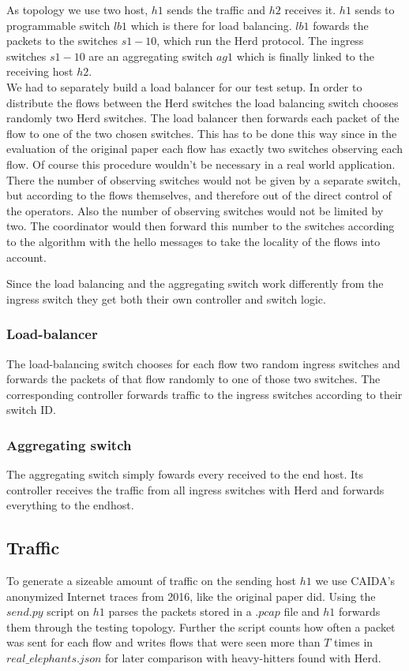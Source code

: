 \documentclass[11pt,oneside,a4paper]{article}
\begin{document}
As topology we use two host, $h1$ sends the traffic and $h2$ receives it. $h1$ sends to programmable switch $lb1$ which is there for load balancing. $lb1$ fowards the packets to the switches $s1 - 10$, which run the Herd protocol. The ingress switches $s1 - 10$ are an aggregating switch $ag1$ which is finally linked to the receiving host $h2$.\\

We had to separately build a load balancer for our test setup. In order to distribute the flows between the Herd switches the load balancing switch chooses randomly two Herd switches. The load balancer then forwards each packet of the flow to one of the two chosen switches. This has to be done this way since in the evaluation of the original paper each flow has exactly two switches observing each flow. Of course this procedure wouldn't be necessary in a real world application. There the number of observing switches would not be given by a separate switch, but according to the flows themselves, and therefore out of the direct control of the operators. Also the number of observing switches would not be limited by two. The coordinator would then forward this number to the switches according to the algorithm with the hello messages to take the locality of the flows into account.

Since the load balancing and the aggregating switch work differently from the ingress switch they get both their own controller and switch logic.

\subsubsection{Load-balancer}
The load-balancing switch chooses for each flow two random ingress switches and forwards the packets of that flow randomly to one of those two switches.
The corresponding controller forwards traffic to the ingress switches according to their switch ID.

\subsubsection{Aggregating switch}
The aggregating switch simply fowards every received to the end host.
Its controller receives the traffic from all ingress switches with Herd and forwards everything to the endhost.

\subsection{Traffic} \label{traffic}
To generate a sizeable amount of traffic on the sending host $h1$ we use CAIDA's anonymized Internet traces from 2016, like the original paper did. Using the $send.py$ script on $h1$ parses the packets stored in a $.pcap$ file and $h1$ forwards them through the testing topology. Further the script counts how often a packet was sent for each flow and writes flows that were seen more than $T$ times in $real\_elephants.json$ for later comparison with heavy-hitters found with Herd.
\end{document}
